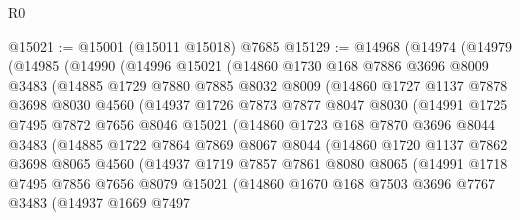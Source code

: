 \begin{lexlean}{R0}
\begin{coremodule}
@15021 := @15001 (@15011 @15018) @7685
@15129 := @14968
    (@14974
      (@14979
        (@14985
          (@14990
            (@14996
              @15021
              (@14860
                @1730
                @168
                @7886
                @3696
                @8009
                @3483
                (@14885
                  @1729
                  @7880
                  @7885
                  @8032
                  @8009
                  (@14860
                    @1727
                    @1137
                    @7878
                    @3698
                    @8030
                    @4560
                    (@14937
                      @1726
                      @7873
                      @7877
                      @8047
                      @8030
                      (@14991
                        @1725
                        @7495
                        @7872
                        @7656
                        @8046
                        @15021
                        (@14860
                          @1723
                          @168
                          @7870
                          @3696
                          @8044
                          @3483
                          (@14885
                            @1722
                            @7864
                            @7869
                            @8067
                            @8044
                            (@14860
                              @1720
                              @1137
                              @7862
                              @3698
                              @8065
                              @4560
                              (@14937
                                @1719
                                @7857
                                @7861
                                @8080
                                @8065
                                (@14991
                                  @1718
                                  @7495
                                  @7856
                                  @7656
                                  @8079
                                  @15021
                                  (@14860
                                    @1670
                                    @168
                                    @7503
                                    @3696
                                    @7767
                                    @3483
                                    (@14937
                                      @1669
                                      @7497

\end{coremodule}
\end{lexlean}
